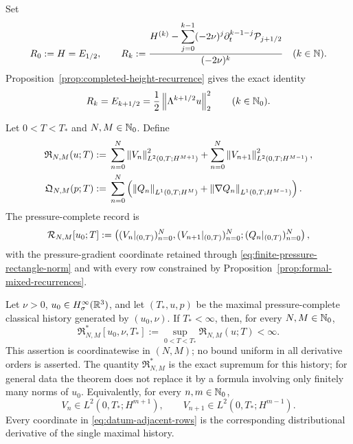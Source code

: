 \begin{definition}
\label{def:completed-critical-height-coordinates}
Set
\begin{equation}
 R_0:=H=E_{1/2},
 \qquad
 R_k
 :=\frac{H^{(k)}-
   \displaystyle\sum_{j=0}^{k-1}(-2\nu)^j
   \partial_t^{k-1-j}\mathcal P_{j+1/2}}
 {(-2\nu)^k}
 \quad(k\in\mathbb N).
 \label{eq:completed-critical-coordinate}
\end{equation}
Proposition~\ref{prop:completed-height-recurrence} gives the exact identity
\begin{equation}
 R_k=E_{k+1/2}
 =\frac12\left\lVert \Lambda^{k+1/2}u\right\rVert_2^2
 \qquad(k\in\mathbb N_0).
 \label{eq:completed-critical-coordinate-identity}
\end{equation}
\end{definition}

\begin{definition}
\label{def:finite-rectangle}
Let \(0<T<T_*\) and \(N,M\in\mathbb N_0\).  Define
\begin{align}
 \mathfrak R_{N,M}(u;T)
 :={}&\sum_{n=0}^{N}
 \left\lVert V_n\right\rVert_{L^2(0,T;H^{M+1})}^2
 +\sum_{n=0}^{N}
 \left\lVert V_{n+1}\right\rVert_{L^2(0,T;H^{M-1})}^2,
 \label{eq:finite-rectangle-norm}\\
 \mathfrak Q_{N,M}(p;T)
 :={}&\sum_{n=0}^{N}
 \left(
 \left\lVert Q_n\right\rVert_{L^1(0,T;H^M)}
 +\left\lVert \nabla Q_n\right\rVert_{L^1(0,T;H^{M-1})}
 \right).
 \label{eq:finite-pressure-rectangle-norm}
\end{align}
The pressure-complete record is
\[
 \mathcal R_{N,M}[u_0;T]
 :=\left(
 (V_n|_{(0,T)})_{n=0}^{N},
 (V_{n+1}|_{(0,T)})_{n=0}^{N};
 (Q_n|_{(0,T)})_{n=0}^{N}
 \right),
\]
with the pressure-gradient coordinate retained through
\eqref{eq:finite-pressure-rectangle-norm} and with every row constrained by
Proposition~\ref{prop:formal-mixed-recurrences}.
\end{definition}

\begin{theorem}
\label{thm:datum-rectangles}
Let \(\nu>0\), \(u_0\in H^\infty_\sigma(\mathbb R^3)\), and let
\((T_*,u,p)\) be the maximal pressure-complete classical history generated
by \((u_0,\nu)\).  If \(T_*<\infty\), then, for every
\(N,M\in\mathbb N_0\),
\begin{equation}
 \mathfrak R_{N,M}^*[u_0,\nu,T_*]
 :=\sup_{0<T<T_*}\mathfrak R_{N,M}(u;T)
 <\infty.
 \label{eq:datum-rectangle-bound}
\end{equation}
This assertion is coordinatewise in \((N,M)\); no bound uniform in all
derivative orders is asserted.  The quantity \(\mathfrak R_{N,M}^*\) is the
exact supremum for this history; for general data the theorem does not replace
it by a formula involving only finitely many norms of \(u_0\).
Equivalently, for every \(n,m\in\mathbb N_0\),
\begin{equation}
 V_n\in L^2(0,T_*;H^{m+1}),
 \qquad
 V_{n+1}\in L^2(0,T_*;H^{m-1}).
 \label{eq:datum-adjacent-rows}
\end{equation}
Every coordinate in \eqref{eq:datum-adjacent-rows} is the corresponding
distributional derivative of the single maximal history.
\end{theorem}

